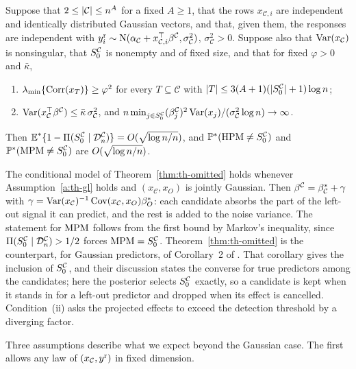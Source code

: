\begin{theorem}\label{thm:th-omitted}
Suppose that $2\le\lvert \mathcal C\rvert\le n^A$ for a fixed $A\ge1$, that the rows $x_{\mathcal C,i}$ are independent and
identically distributed Gaussian vectors, and that, given them, the responses are independent with
$y^{\mathrm r}_i\sim\mathrm{N}(\alpha_{\mathcal C}+x_{\mathcal C,i}^\top\beta^{\mathcal C},\sigma^2_{\mathcal C})$,
$\sigma^2_{\mathcal C}>0$. Suppose also that $\operatorname{Var}(x_{\mathcal C})$ is nonsingular, that $S_0^{\mathcal C}$ is nonempty and of fixed size,
and that for fixed $\varphi>0$ and $\bar\kappa$,
\begin{enumerate}[label=(\roman*)]
  \item $\lambda_{\min}\{\operatorname{Corr}(x_T)\}\ge\varphi^2$ for every $T\subseteq\mathcal C$ with $\lvert T\rvert\le3(A+1)(\lvert S_0^{\mathcal C}\rvert+1)\log n$;
  \item $\operatorname{Var}(x_{\mathcal C}^\top\beta^{\mathcal C})\le\bar\kappa\,\sigma^2_{\mathcal C}$, and
    $n\min_{j\in S_0^{\mathcal C}}(\beta^{\mathcal C}_j)^2\operatorname{Var}(x_j)/(\sigma^2_{\mathcal C}\log n)\to\infty$.
\end{enumerate}
Then $\operatorname{\mathbb{E}}^*\{1-\Pi(S_0^{\mathcal C}\mid\mathcal D_n^{\mathcal C})\}=O(\sqrt{\log n/n})$, and $\mathbb{P}^*(\mathrm{HPM}\ne S_0^{\mathcal C})$ and
$\mathbb{P}^*(\mathrm{MPM}\ne S_0^{\mathcal C})$ are $O(\sqrt{\log n/n})$.
\end{theorem}

The conditional model of Theorem~\ref{thm:th-omitted} holds whenever Assumption~\ref{a:th-gl} holds and
$(x_{\mathcal C},x_O)$ is jointly Gaussian. Then $\beta^{\mathcal C}=\beta^*_{\mathcal C}+\gamma$ with
$\gamma=\operatorname{Var}(x_{\mathcal C})^{-1}\operatorname{Cov}(x_{\mathcal C},x_O)\beta^*_O$: each candidate absorbs the part of the left-out
signal it can predict, and the rest is added to the noise variance. The statement for $\mathrm{MPM}$ follows from the first
bound by Markov's inequality, since $\Pi(S_0^{\mathcal C}\mid\mathcal D_n^{\mathcal C})>1/2$ forces $\mathrm{MPM}=S_0^{\mathcal C}$.
Theorem~\ref{thm:th-omitted} is the counterpart, for Gaussian predictors, of Corollary~2 of \citet{SongLiang2015}. That
corollary gives the inclusion of $S_0^{\mathcal C}$, and their discussion states the converse for true predictors among the candidates; here the posterior
selects $S_0^{\mathcal C}$ exactly, so a candidate is kept when it stands in for a left-out predictor and dropped when
its effect is cancelled. Condition~(ii) asks the projected effects to exceed the detection threshold by a diverging
factor.

Three assumptions describe what we expect beyond the Gaussian case. The first allows any law of $(x_{\mathcal C},y^{\mathrm r})$
in fixed dimension.

